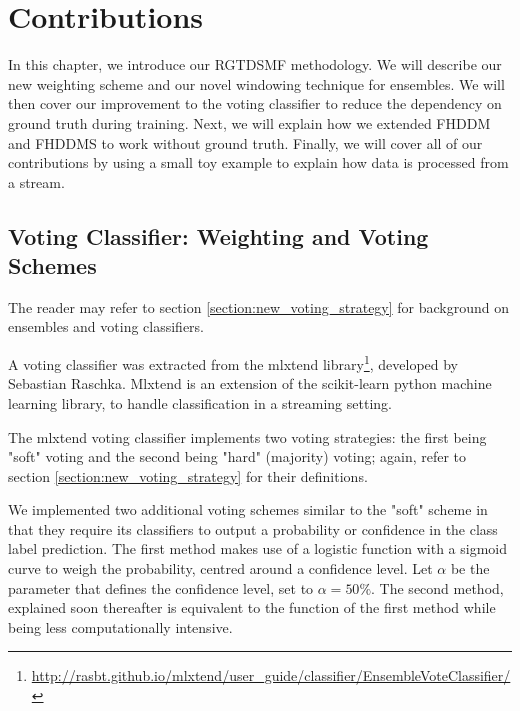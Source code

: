 \chapter{Contributions\label{chapter:contributions}}%

In this chapter, we introduce our RGTDSMF methodology. We will describe our new weighting scheme and our novel windowing technique for ensembles. We will then cover our improvement to the voting classifier to reduce the dependency on ground truth during training. Next, we will explain how we extended FHDDM and FHDDMS to work without ground truth. Finally, we will cover all of our contributions by using a small toy example to explain how data is processed from a stream.


\section{Voting Classifier: Weighting and Voting Schemes \label{section:new_voting_strategy}}

The reader may refer to section \ref{section:new_voting_strategy} for background on ensembles and voting classifiers.

A voting classifier was extracted from the mlxtend library\footnote{\url{http://rasbt.github.io/mlxtend/user_guide/classifier/EnsembleVoteClassifier/}}, developed by Sebastian Raschka. Mlxtend is an extension of the scikit-learn python machine learning library, to handle classification in a streaming setting.

The mlxtend voting classifier implements two voting strategies: the first being "soft" voting and the second being "hard" (majority) voting; again, refer to section \ref{section:new_voting_strategy} for their definitions.

We implemented two additional voting schemes similar to the "soft" scheme in that they require its classifiers to output a probability or confidence in the class label prediction. The first method makes use of a logistic function with a sigmoid curve to weigh the probability, centred around a  confidence level. Let $\alpha$ be the parameter that defines the confidence level, set to \textbf{\textit{$\alpha=50\%$}}. The second method, explained soon thereafter is equivalent to the function of the first method while being less computationally intensive.


